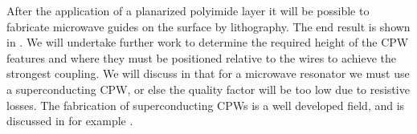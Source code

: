 After the application of a planarized polyimide layer it will be possible to
fabricate microwave guides on the surface by lithography. The end result is
shown in . We will undertake further work to
determine the required height of the CPW features and where they must be
positioned relative to the wires to achieve the strongest coupling. We will
discuss in  that for a microwave resonator we must use
a superconducting CPW, or else the quality factor will be too low due to
resistive losses. The fabrication of superconducting CPWs is a well developed
field, and is discussed in for example .
